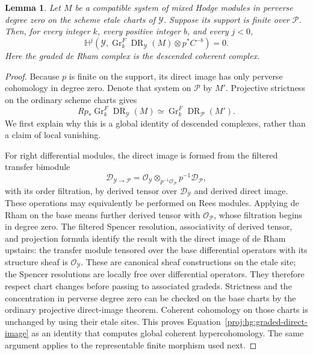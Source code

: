 \documentclass[11pt,letterpaper]{article}
\newtheorem{lemma}[theorem]{Lemma}
\theoremstyle{definition}
\theoremstyle{remark}
\begin{document}
\begin{lemma}\label{proj:hg:negative-vanishing}
Let \(M\) be a compatible system of mixed Hodge modules in perverse
degree zero on the scheme etale charts of \(\mathcal Y\).  Suppose
its support is finite over \(\mathcal P\).  Then, for every integer
\(k\), every positive integer \(b\), and every \(j<0\),
\[
 \mathbb H^j\!\left(
   \mathcal Y,\operatorname{Gr}^F_k\operatorname{DR}_{\mathcal Y}(M)\otimes p^*C^{-b}
 \right)=0.
\]
Here the graded de Rham complex is the descended coherent complex.
\end{lemma}

\begin{proof}
Because \(p\) is finite on the support, its direct image has only
perverse cohomology in degree zero.  Denote that system on
\(\mathcal P\) by \(M'\).  Projective strictness on the ordinary
scheme charts gives
\begin{equation}\label{proj:hg:graded-direct-image}
 Rp_*\operatorname{Gr}^F_k\operatorname{DR}_{\mathcal Y}(M)
 \simeq \operatorname{Gr}^F_k\operatorname{DR}_{\mathcal P}(M').
\end{equation}
We first explain why this is a global identity of descended complexes,
rather than a claim of local vanishing.

For right differential modules, the direct image is formed from the
filtered transfer bimodule
\[
 \mathcal D_{\mathcal Y\to\mathcal P}
 =
 \mathcal{O}_{\mathcal Y}\otimes_{p^{-1}\mathcal{O}_{\mathcal P}}
                         p^{-1}\mathcal D_{\mathcal P},
\]
with its order filtration, by derived tensor over
\(\mathcal D_{\mathcal Y}\) and derived direct image.  These operations
may equivalently be performed on Rees modules.  Applying de Rham on
the base means further derived tensor with \(\mathcal{O}_{\mathcal P}\),
whose filtration begins in degree zero.  The filtered Spencer
resolution, associativity of derived tensor, and projection formula
identify the result with the direct image of de Rham upstairs:
the transfer module tensored over the base differential operators
with its structure sheaf is \(\mathcal{O}_{\mathcal Y}\).
These are canonical sheaf constructions on the etale site; the
Spencer resolutions are locally free over differential operators.
They therefore respect chart changes before passing to associated
gradeds.  Strictness and the concentration in perverse degree zero
can be checked on the base charts by the ordinary projective
direct-image theorem.  Coherent cohomology on those charts is
unchanged by using their etale sites.  This proves
Equation~\eqref{proj:hg:graded-direct-image} as an identity that computes
global coherent hypercohomology.  The same argument applies to the
representable finite morphism used next.


\end{proof}
\end{document}
